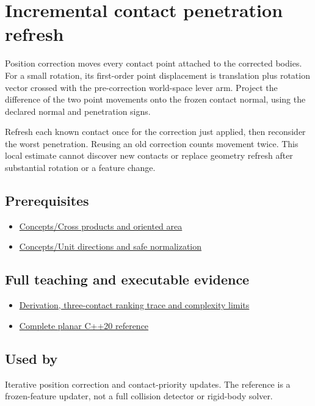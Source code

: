 \hypertarget{appendix-f682275acbdf}{}\label{referencestart:appendix-f682275acbdf}
\section{Incremental contact penetration refresh}\label{appendix-f682275acbdf-incremental-contact-penetration-refresh}

Position correction moves every contact point attached to the corrected bodies. For a small rotation, its first-order point displacement is translation plus rotation vector crossed with the pre-correction world-space lever arm. Project the difference of the two point movements onto the frozen contact normal, using the declared normal and penetration signs.

Refresh each known contact once for the correction just applied, then reconsider the worst penetration. Reusing an old correction counts movement twice. This local estimate cannot discover new contacts or replace geometry refresh after substantial rotation or a feature change.

\subsection{Prerequisites}\label{appendix-f682275acbdf-prerequisites}

\begin{itemize}
\tightlist
\item
  \hyperref[appendix-2391db8052b1]{Concepts/Cross products and oriented area}
\item
  \hyperref[appendix-f744e41b95b4]{Concepts/Unit directions and safe normalization}
\end{itemize}

\subsection{Full teaching and executable evidence}\label{appendix-f682275acbdf-full-teaching-and-executable-evidence}

\begin{itemize}
\tightlist
\item
  \hyperref[06-engine-ii-ch046-refresh-neighboring-penetrations-after-position-correction]{Derivation, three-contact ranking trace and complexity limits}
\item
  \hyperref[06-engine-ii-ch046-a-planar-penetration-refresh-witness]{Complete planar C++20 reference}
\end{itemize}

\subsection{Used by}\label{appendix-f682275acbdf-used-by}

Iterative position correction and contact-priority updates. The reference is a frozen-feature updater, not a full collision detector or rigid-body solver.
